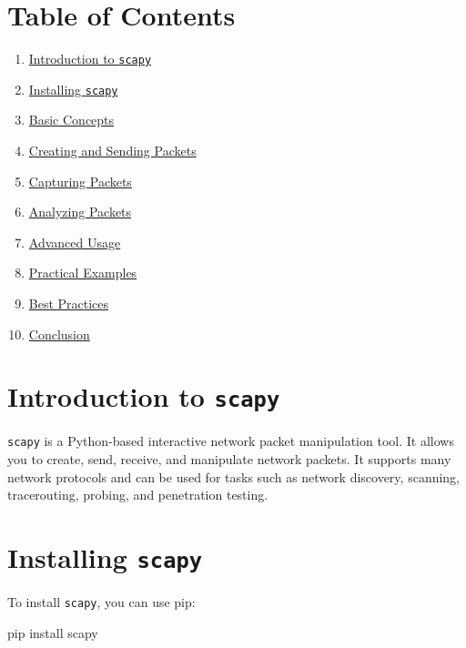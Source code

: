 \documentclass[
  letterpaper,
  DIV=11,
  numbers=noendperiod]{scrreprt}
\newenvironment{Shaded}{\begin{snugshade}}{\end{snugshade}}
\newcommand{\ExtensionTok}[1]{\textcolor[rgb]{0.00,0.23,0.31}{#1}}
\newcommand{\NormalTok}[1]{\textcolor[rgb]{0.00,0.23,0.31}{#1}}
\providecommand{\tightlist}{%
  \setlength{\itemsep}{0pt}\setlength{\parskip}{0pt}}\usepackage{longtable,booktabs,array}
\begin{document}
\section{Table of Contents}\label{table-of-contents-17}

\begin{enumerate}
\def\labelenumi{\arabic{enumi}.}
\tightlist
\item
  \hyperref[introduction-to-scapy]{Introduction to \texttt{scapy}}
\item
  \hyperref[installing-scapy]{Installing \texttt{scapy}}
\item
  \hyperref[basic-concepts]{Basic Concepts}
\item
  \hyperref[creating-and-sending-packets]{Creating and Sending Packets}
\item
  \hyperref[capturing-packets]{Capturing Packets}
\item
  \hyperref[analyzing-packets]{Analyzing Packets}
\item
  \hyperref[advanced-usage]{Advanced Usage}
\item
  \hyperref[practical-examples]{Practical Examples}
\item
  \hyperref[best-practices]{Best Practices}
\item
  \hyperref[conclusion]{Conclusion}
\end{enumerate}

\section{\texorpdfstring{Introduction to
\texttt{scapy}}{Introduction to scapy}}\label{introduction-to-scapy}

\texttt{scapy} is a Python-based interactive network packet manipulation
tool. It allows you to create, send, receive, and manipulate network
packets. It supports many network protocols and can be used for tasks
such as network discovery, scanning, tracerouting, probing, and
penetration testing.

\section{\texorpdfstring{Installing
\texttt{scapy}}{Installing scapy}}\label{installing-scapy-1}

To install \texttt{scapy}, you can use pip:

\begin{Shaded}
\begin{Highlighting}[]
\ExtensionTok{pip}\NormalTok{ install scapy}
\end{Highlighting}
\end{Shaded}
\end{document}
